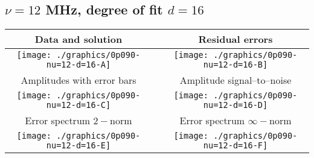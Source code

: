 

% 

\clearpage{}
\break{}

\subsection{$\nu = 12$ MHz, degree of fit $d = 16$}

\begin{table}[h]
    \begin{center}
        \begin{tabular}{ccc}
            Data and solution & \quad & Residual errors \\\hline
            \texttt{[image: ./graphics/0p090-nu=12-d=16-A]} &&
            \texttt{[image: ./graphics/0p090-nu=12-d=16-B]} \\[15pt]
            Amplitudes with error bars && Amplitude signal--to--noise \\\hline
            \texttt{[image: ./graphics/0p090-nu=12-d=16-C]} &&
            \texttt{[image: ./graphics/0p090-nu=12-d=16-D]} \\[15pt]
            Error spectrum $2-$norm && Error spectrum $\infty-$norm \\\hline
            \texttt{[image: ./graphics/0p090-nu=12-d=16-E]} &&
            \texttt{[image: ./graphics/0p090-nu=12-d=16-F]} \\[15pt]
        \end{tabular}
    \end{center}
\label{fig:elev=90, nu=12}
\end{table}



\endinput
